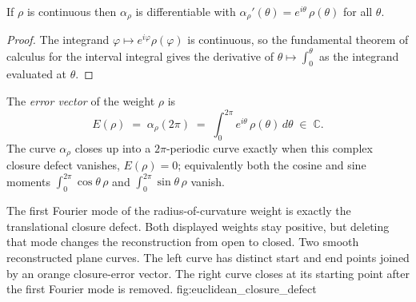 \begin{lemma}
  \label{lem:reconstruct_deriv}
  If $\rho$ is continuous then $\alpha_\rho$ is differentiable with
  $\alpha_\rho'(\theta) = e^{i\theta}\,\rho(\theta)$ for all $\theta$.
\end{lemma}
\begin{proof}

\leanok
  The integrand $\varphi \mapsto e^{i\varphi}\rho(\varphi)$ is continuous, so the
  fundamental theorem of calculus for the interval integral gives the derivative
  of $\theta \mapsto \int_0^\theta$ as the integrand evaluated at $\theta$.
\end{proof}

\begin{definition}
  \label{def:error_vector}
  The \emph{error vector} of the weight $\rho$ is
  \[
    E(\rho) \;=\; \alpha_\rho(2\pi)
      \;=\; \int_0^{2\pi} e^{i\theta}\,\rho(\theta)\,d\theta
      \;\in\; \mathbb{C}.
  \]
  The curve $\alpha_\rho$ closes up into a $2\pi$-periodic curve exactly when this
  complex closure defect vanishes, $E(\rho) = 0$; equivalently both the cosine and
  sine moments $\int_0^{2\pi}\cos\theta\,\rho$ and $\int_0^{2\pi}\sin\theta\,\rho$
  vanish.
\end{definition}

  {The first Fourier mode of the radius-of-curvature weight is exactly the
   translational closure defect. Both displayed weights stay positive, but
   deleting that mode changes the reconstruction from open to closed.}
  {Two smooth reconstructed plane curves. The left curve has distinct start and
   end points joined by an orange closure-error vector. The right curve closes
   at its starting point after the first Fourier mode is removed.}
  {fig:euclidean_closure_defect}
